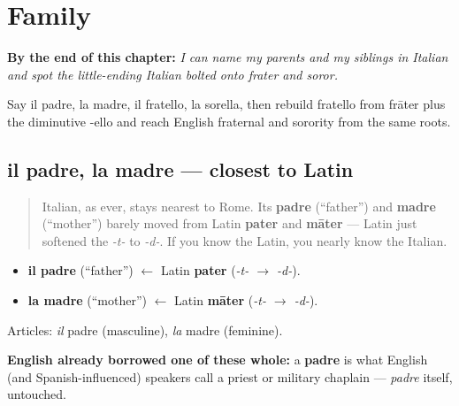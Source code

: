 
\chapter{Family}
\label{ch:it-family}

\begin{chapteropening}
\textbf{By the end of this chapter:} \emph{I can name my parents and my siblings in Italian and spot the little-ending Italian bolted onto frater and soror.}

Say il padre, la madre, il fratello, la sorella, then rebuild fratello from frāter plus the diminutive -ello and reach English fraternal and sorority from the same roots.
\end{chapteropening}

\section[il padre, la madre]{il padre, la madre — closest to Latin}

\label{lesson:IT-C10-genitori}



\begin{quote}
Italian, as ever, stays nearest to Rome. Its \textbf{padre} (\textquotedblleft{}father\textquotedblright{}) and \textbf{madre} (\textquotedblleft{}mother\textquotedblright{}) barely moved from Latin \textbf{pater} and \textbf{māter} — Latin just softened the \emph{-t-} to \emph{-d-}. If you know the Latin, you nearly know the Italian.
\end{quote}

\begin{cousinweb}
\begin{itemize}
\raggedright
  \item \textbf{il padre} (\textquotedblleft{}father\textquotedblright{}) $\leftarrow$ Latin \textbf{pater} (\emph{-t- $\to$ -d-}).
  \item \textbf{la madre} (\textquotedblleft{}mother\textquotedblright{}) $\leftarrow$ Latin \textbf{māter} (\emph{-t- $\to$ -d-}).
\end{itemize}

Articles: \emph{il} padre (masculine), \emph{la} madre (feminine).

\textbf{English already borrowed one of these whole:} a \textbf{padre} is what English (and Spanish-influenced) speakers call a priest or military chaplain — \emph{padre} itself, untouched.
\end{cousinweb}

